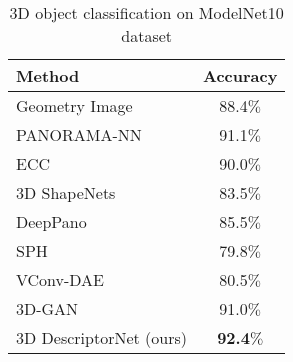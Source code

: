 \documentclass[10pt,twocolumn,letterpaper]{article}
\begin{document}
\begin{table}[h]
\caption{3D object classification on ModelNet10 dataset}\label{exp:classification}
\vspace{-2mm}
\centering
\begin{small}
\begin{tabular}{|l|c|}
\hline
          Method   &  Accuracy\\ \hline \hline
     Geometry Image \cite{sinha2016deep} & 88.4$\%$\\ \hline      
      
      PANORAMA-NN    \cite{sfikas2017exploiting} & 91.1$\%$ \\ \hline
    ECC  \cite{simonovsky2017dynamic} & 90.0$\%$\\ \hline    
       3D ShapeNets \cite{wu20153d}  & 83.5$\%$ \\ \hline
        DeepPano \cite{shi2015deeppano} & 85.5$\%$ \\ \hline
 SPH  \cite{kazhdan2003rotation}     & 79.8$\%$    \\ \hline
 VConv-DAE   \cite{sharma2016vconv}   & 80.5$\%$   \\ \hline
 3D-GAN  \cite{3dgan}  & 91.0$\%$  \\ \hline
  3D DescriptorNet (ours) & \textbf{92.4}$\%$\\ \hline 
\end{tabular}
\end{small}
\end{table}
\vspace{-3mm}
\end{document}
